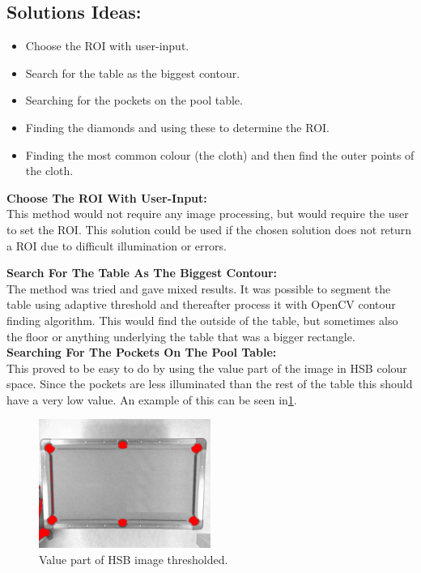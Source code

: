 \subsection{Solutions Ideas:}

\begin{itemize}
\setlength{\itemsep}{0mm}
	\item Choose the ROI with user-input.
	\item Search for the table as the biggest contour.
	\item Searching for the pockets on the pool table.
	\item Finding the diamonds and using these to determine the ROI.
	\item Finding the most common colour (the cloth) and then find the outer points of the cloth.
\end{itemize}

\textbf{Choose The ROI With User-Input:}\\
This method would not require any image processing, but would require the user to set the ROI. This solution could be used if the chosen solution does not return a ROI due to difficult illumination or errors.

\textbf{Search For The Table As The Biggest Contour:}\\
The method was tried and gave mixed results. It was possible to segment the table using adaptive threshold and thereafter process it with OpenCV \cite{opencv} contour finding algorithm. This would find the outside of the table, but sometimes also the floor or anything underlying the table that was a bigger rectangle. \\

\textbf{Searching For The Pockets On The Pool Table:}\\
This proved to be easy to do by using the value part of the image in HSB colour space. Since the pockets are less illuminated than the rest of the table this should have a very low value. An example of this can be seen in\ref{fig:value_thres}. 

\begin{figure}[H]
\begin{center}
\leavevmode
\includegraphics[width=0.5\textwidth]{images/value_thres}
\end{center}
\caption{Value part of HSB image thresholded.}
\label{fig:value_thres}
\end{figure}

